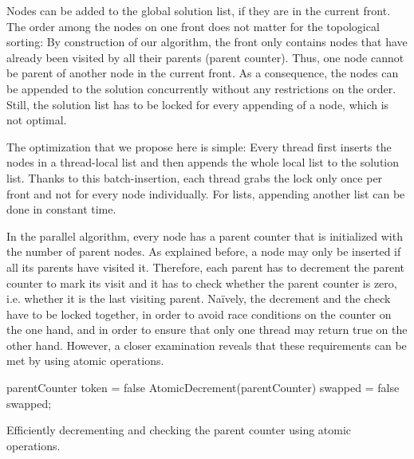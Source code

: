 Nodes can be added to the global solution list, if they are in the current front.
The order among the nodes on one front does not matter for the topological sorting:
By construction of our algorithm, the front only contains nodes that have already been visited by all their parents (parent counter). Thus, one node cannot be parent of another node in the current front.
As a consequence, the nodes can be appended to the solution concurrently without any restrictions on the order.
Still, the solution list has to be locked for every appending of a node, which is not optimal.

The optimization that we propose here is simple: Every thread first inserts the nodes in a thread-local list and then appends the whole local list to the solution list.
Thanks to this batch-insertion, each thread grabs the lock only once per front and not for every node individually.
For lists, appending another list can be done in constant time.

In the parallel algorithm, every node has a parent counter that is initialized with the number of parent nodes.
As explained before, a node may only be inserted if all its parents have visited it.
Therefore, each parent has to decrement the parent counter to mark its visit and it has to check whether the parent counter is zero, i.e. whether it is the last visiting parent.
Na{\"i}vely, the decrement and the check have to be locked together, in order to avoid race conditions on the counter on the one hand, and in order to ensure that only one thread may return true on the other hand. 
However, a closer examination reveals that these requirements can be met by using atomic operations.

\begin{listing}
  \KwInt parentCounter\;
  \KwBool token = false\;
   {
    AtomicDecrement(parentCounter)\;
    \KwBool swapped = false\;
    \KwRet swapped;
  }
 \caption{Efficiently decrementing and checking the parent counter using atomic operations.}
 \label{lst:parentCounter}
\end{listing}

